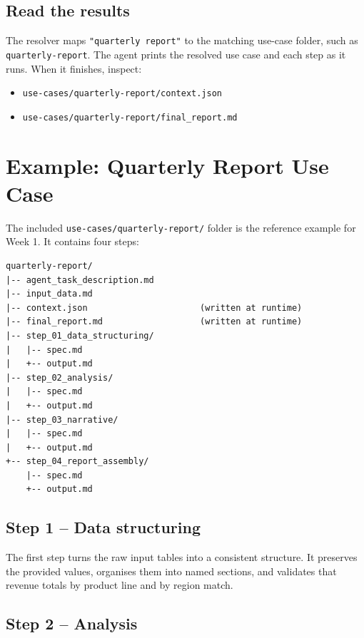 \documentclass[12pt, a4paper]{article}
\begin{document}
\subsection{Read the results}

The resolver maps \texttt{"quarterly report"} to the matching use-case folder, such as \texttt{quarterly-report}. The agent prints the resolved use case and each step as it runs. When it finishes, inspect:

\begin{itemize}[leftmargin=1.5em]
  \item \texttt{use-cases/quarterly-report/context.json}
  \item \texttt{use-cases/quarterly-report/final\_report.md}
\end{itemize}

\clearpage

\section{Example: Quarterly Report Use Case}

The included \texttt{use-cases/quarterly-report/} folder is the reference example for Week 1. It contains four steps:

\begin{lstlisting}[style=plainstyle]
quarterly-report/
|-- agent_task_description.md
|-- input_data.md
|-- context.json                      (written at runtime)
|-- final_report.md                   (written at runtime)
|-- step_01_data_structuring/
|   |-- spec.md
|   +-- output.md
|-- step_02_analysis/
|   |-- spec.md
|   +-- output.md
|-- step_03_narrative/
|   |-- spec.md
|   +-- output.md
+-- step_04_report_assembly/
    |-- spec.md
    +-- output.md
\end{lstlisting}

\subsection{Step 1 -- Data structuring}

The first step turns the raw input tables into a consistent structure. It preserves the provided values, organises them into named sections, and validates that revenue totals by product line and by region match.

\subsection{Step 2 -- Analysis}
\end{document}
